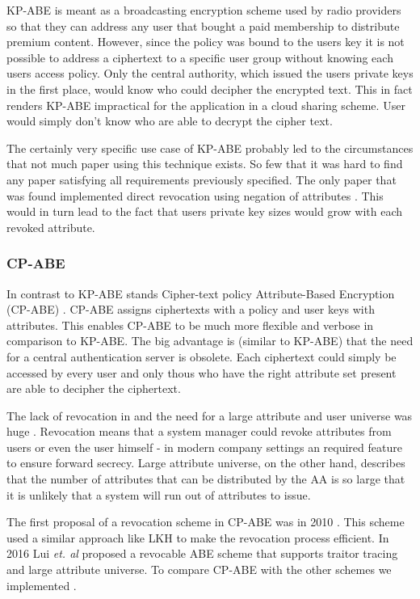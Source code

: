 KP-ABE is meant as a broadcasting encryption scheme used by radio providers so that they can address any user that bought a paid membership to distribute premium content. However, since the policy was bound to the users key it is not possible to address a ciphertext to a specific user group without knowing each users access policy. Only the central authority, which issued the users private keys in the first place, would know who could decipher the encrypted text. This in fact renders \ac{KP-ABE} impractical for the application in a cloud sharing scheme. User would simply don't know who are able to decrypt the cipher text. 

The certainly very specific use case of \ac{KP-ABE} probably led to the circumstances that not much paper using this technique exists. So few that it was hard to find any paper satisfying all requirements previously specified. The only paper that was found implemented direct revocation using negation of attributes \cite{lewko2010revocation}. This would in turn lead to the fact that users private key sizes would grow with each revoked attribute. 

\subsubsection{\ac{CP-ABE}}
In contrast to KP-ABE stands Cipher-text policy Attribute-Based Encryption (\ac{CP-ABE}) \cite{bethencourt2007ciphertext}. \ac{CP-ABE} assigns ciphertexts with a policy and user keys with attributes. This enables \ac{CP-ABE} to be much more flexible and verbose in comparison to \ac{KP-ABE}. The big advantage is (similar to \ac{KP-ABE}) that the need for a central authentication server is obsolete. Each ciphertext could simply be accessed by every user and only thous who have the right attribute set present are able to decipher the ciphertext. 

The lack of revocation  in \cite{bethencourt2007ciphertext} and the need for a large attribute and user universe was huge . Revocation means that a system manager could revoke attributes from users or even the user himself - in modern company settings an required feature to ensure forward secrecy. Large attribute universe, on the other hand, describes that the number of attributes that can be distributed by the \ac{AA} is so large that it is unlikely that a system will run out of attributes to issue. 

The first proposal of a revocation scheme in \ac{CP-ABE} was in 2010 \cite{liang2010ciphertext}. This scheme used a similar approach like \ac{LKH} to make the revocation process efficient. In 2016 Lui \textit{et. al} \cite{liu2016practical} proposed a revocable \ac{ABE} scheme that supports traitor tracing and large attribute universe. To compare CP-ABE with the other schemes we implemented \cite{liu2016practical}. 

